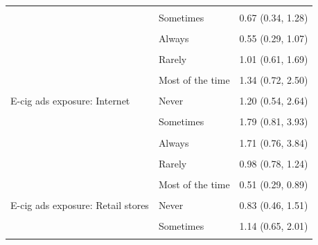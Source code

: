 \begin{longtable}[t]{>{\raggedright\arraybackslash}p{5cm}>{\raggedright\arraybackslash}p{5.5cm}r}
\cellcolor{gray!6}{} & \cellcolor{gray!6}{Rarely} & \cellcolor{gray!6}{0.82 (0.44, 1.53)}\\
\addlinespace
 & Sometimes & 0.67 (0.34, 1.28)\\
\cellcolor{gray!6}{} & \cellcolor{gray!6}{Most of the time} & \cellcolor{gray!6}{0.58 (0.31, 1.08)}\\
 & Always & 0.55 (0.29, 1.07)\\
\cellcolor{gray!6}{Tobacco ads exposure: TV/Streaming/Movies} & \cellcolor{gray!6}{Never} & \cellcolor{gray!6}{1.02 (0.63, 1.67)}\\
 & Rarely & 1.01 (0.61, 1.69)\\
\addlinespace
\cellcolor{gray!6}{} & \cellcolor{gray!6}{Sometimes} & \cellcolor{gray!6}{1.00 (0.60, 1.65)}\\
 & Most of the time & 1.34 (0.72, 2.50)\\
\cellcolor{gray!6}{} & \cellcolor{gray!6}{Always} & \cellcolor{gray!6}{0.86 (0.40, 1.84)}\\
E-cig ads exposure: Internet & Never & 1.20 (0.54, 2.64)\\
\cellcolor{gray!6}{} & \cellcolor{gray!6}{Rarely} & \cellcolor{gray!6}{1.73 (0.82, 3.67)}\\
\addlinespace
 & Sometimes & 1.79 (0.81, 3.93)\\
\cellcolor{gray!6}{} & \cellcolor{gray!6}{Most of the time} & \cellcolor{gray!6}{1.87 (0.82, 4.22)}\\
 & Always & 1.71 (0.76, 3.84)\\
\cellcolor{gray!6}{E-cig ads exposure: Newspapers/Magazines} & \cellcolor{gray!6}{Never} & \cellcolor{gray!6}{1.44 (1.10, 1.87)}\\
 & Rarely & 0.98 (0.78, 1.24)\\
\addlinespace
\cellcolor{gray!6}{} & \cellcolor{gray!6}{Sometimes} & \cellcolor{gray!6}{0.75 (0.58, 0.98)}\\
 & Most of the time & 0.51 (0.29, 0.89)\\
\cellcolor{gray!6}{} & \cellcolor{gray!6}{Always} & \cellcolor{gray!6}{0.47 (0.25, 0.92)}\\
E-cig ads exposure: Retail stores & Never & 0.83 (0.46, 1.51)\\
\cellcolor{gray!6}{} & \cellcolor{gray!6}{Rarely} & \cellcolor{gray!6}{0.95 (0.54, 1.68)}\\
\addlinespace
 & Sometimes & 1.14 (0.65, 2.01)\\
\cellcolor{gray!6}{} & \cellcolor{gray!6}{Most of the time} & \cellcolor{gray!6}{1.46 (0.83, 2.56)}\\

\end{longtable}
